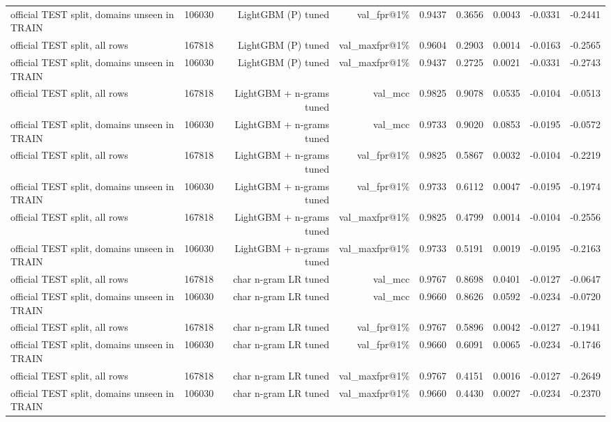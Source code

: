 \begin{table}[t]
\begin{tabular}{llrrrrrrr}
official TEST split, domains unseen in TRAIN & 106030 & LightGBM (P) tuned & val\_fpr@1\% & 0.9437 & 0.3656 & 0.0043 & -0.0331 & -0.2441 \\
official TEST split, all rows & 167818 & LightGBM (P) tuned & val\_maxfpr@1\% & 0.9604 & 0.2903 & 0.0014 & -0.0163 & -0.2565 \\
official TEST split, domains unseen in TRAIN & 106030 & LightGBM (P) tuned & val\_maxfpr@1\% & 0.9437 & 0.2725 & 0.0021 & -0.0331 & -0.2743 \\
official TEST split, all rows & 167818 & LightGBM + n-grams tuned & val\_mcc & 0.9825 & 0.9078 & 0.0535 & -0.0104 & -0.0513 \\
official TEST split, domains unseen in TRAIN & 106030 & LightGBM + n-grams tuned & val\_mcc & 0.9733 & 0.9020 & 0.0853 & -0.0195 & -0.0572 \\
official TEST split, all rows & 167818 & LightGBM + n-grams tuned & val\_fpr@1\% & 0.9825 & 0.5867 & 0.0032 & -0.0104 & -0.2219 \\
official TEST split, domains unseen in TRAIN & 106030 & LightGBM + n-grams tuned & val\_fpr@1\% & 0.9733 & 0.6112 & 0.0047 & -0.0195 & -0.1974 \\
official TEST split, all rows & 167818 & LightGBM + n-grams tuned & val\_maxfpr@1\% & 0.9825 & 0.4799 & 0.0014 & -0.0104 & -0.2556 \\
official TEST split, domains unseen in TRAIN & 106030 & LightGBM + n-grams tuned & val\_maxfpr@1\% & 0.9733 & 0.5191 & 0.0019 & -0.0195 & -0.2163 \\
official TEST split, all rows & 167818 & char n-gram LR tuned & val\_mcc & 0.9767 & 0.8698 & 0.0401 & -0.0127 & -0.0647 \\
official TEST split, domains unseen in TRAIN & 106030 & char n-gram LR tuned & val\_mcc & 0.9660 & 0.8626 & 0.0592 & -0.0234 & -0.0720 \\
official TEST split, all rows & 167818 & char n-gram LR tuned & val\_fpr@1\% & 0.9767 & 0.5896 & 0.0042 & -0.0127 & -0.1941 \\
official TEST split, domains unseen in TRAIN & 106030 & char n-gram LR tuned & val\_fpr@1\% & 0.9660 & 0.6091 & 0.0065 & -0.0234 & -0.1746 \\
official TEST split, all rows & 167818 & char n-gram LR tuned & val\_maxfpr@1\% & 0.9767 & 0.4151 & 0.0016 & -0.0127 & -0.2649 \\
official TEST split, domains unseen in TRAIN & 106030 & char n-gram LR tuned & val\_maxfpr@1\% & 0.9660 & 0.4430 & 0.0027 & -0.0234 & -0.2370 \\

\end{tabular}
\end{table}

